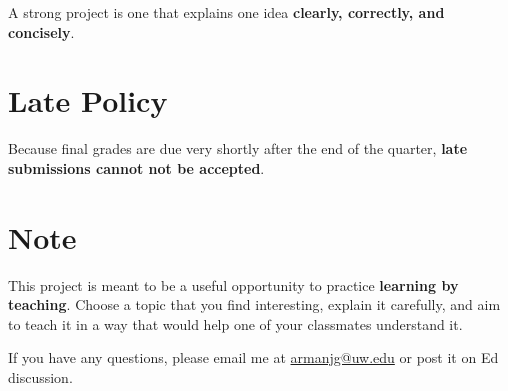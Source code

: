 \documentclass[11pt]{article}
\begin{document}
A strong project is one that explains one idea \textbf{clearly, correctly, and concisely}. 

\section*{Late Policy}

Because final grades are due very shortly after the end of the quarter, \textbf{late submissions cannot not be accepted}. 

\section*{Note}

This project is meant to be a useful opportunity to practice \textbf{learning by teaching}. Choose a topic that you find interesting, explain it carefully, and aim to teach it in a way that would  help one of your classmates understand it.

If you have any questions, please email me at \href{mailto:armanjg@uw.edu}{armanjg@uw.edu} or post it on Ed discussion.
\end{document}
